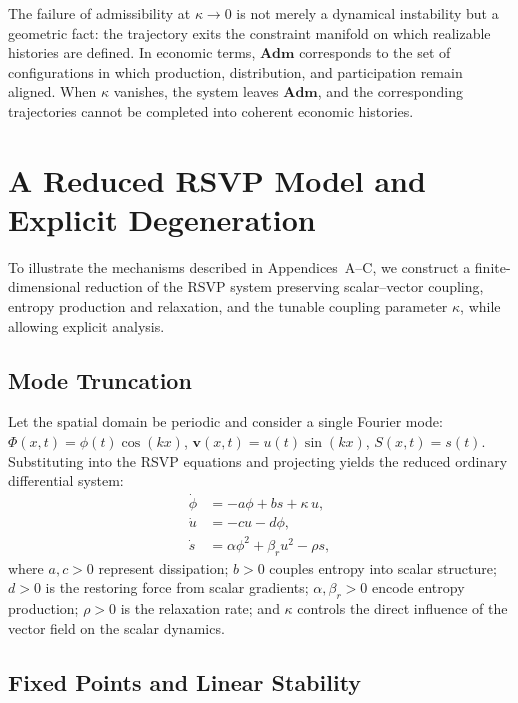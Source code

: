 \documentclass[11pt, a4paper]{article}
\theoremstyle{plain}
\theoremstyle{definition}
\newcommand{\Phifield}{\Phi}
\newcommand{\vfield}{\mathbf{v}}
\newcommand{\Sfield}{S}
\newcommand{\Adm}{\mathbf{Adm}}
\newcommand{\coupling}{\kappa}
\begin{document}
The failure of admissibility at $\coupling \to 0$ is not merely a dynamical
instability but a geometric fact: the trajectory exits the constraint manifold
on which realizable histories are defined. In economic terms, $\Adm$ corresponds
to the set of configurations in which production, distribution, and participation
remain aligned. When $\coupling$ vanishes, the system leaves $\Adm$, and the
corresponding trajectories cannot be completed into coherent economic histories.

\section{A Reduced RSVP Model and Explicit Degeneration}

To illustrate the mechanisms described in Appendices~A--C, we construct a
finite-dimensional reduction of the RSVP system preserving scalar--vector
coupling, entropy production and relaxation, and the tunable coupling
parameter $\coupling$, while allowing explicit analysis.

\subsection{Mode Truncation}

Let the spatial domain be periodic and consider a single Fourier mode:
$\Phifield(x,t) = \phi(t) \cos(kx)$,
$\vfield(x,t) = u(t) \sin(kx)$,
$\Sfield(x,t) = s(t)$.
Substituting into the RSVP equations and projecting yields the reduced
ordinary differential system:
\begin{align}
  \dot{\phi}
  &= -a \phi + b s + \coupling\, u, \label{eq:reduced_phi} \\[4pt]
  \dot{u}
  &= -c u - d \phi, \label{eq:reduced_u} \\[4pt]
  \dot{s}
  &= \alpha \phi^2 + \beta_r u^2 - \rho s, \label{eq:reduced_s}
\end{align}
where $a, c > 0$ represent dissipation; $b > 0$ couples entropy into scalar
structure; $d > 0$ is the restoring force from scalar gradients; $\alpha, \beta_r > 0$
encode entropy production; $\rho > 0$ is the relaxation rate; and $\coupling$
controls the direct influence of the vector field on the scalar dynamics.

\subsection{Fixed Points and Linear Stability}
\end{document}
